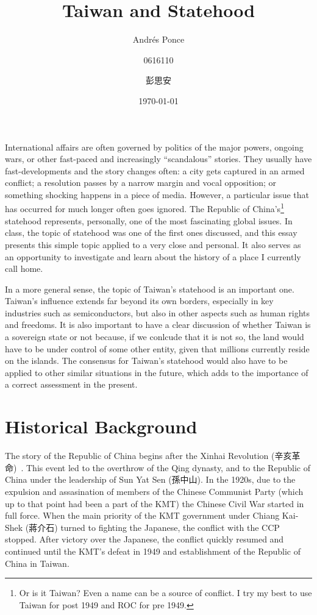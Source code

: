 \documentclass{article}
\author{Andr\'es Ponce \\
\and
0616110 \\
\and
彭思安
}
\title{Taiwan and Statehood}
\date{\today}
\begin{document}
\maketitle
International affairs are often governed by politics of the major powers, ongoing wars,
or other fast-paced and increasingly ``scandalous'' stories. They usually have fast-developments
and the story changes often: a city gets captured in an armed conflict; a resolution 
passes by a narrow margin and vocal opposition; or something shocking happens in a 
piece of media. 
However, a particular issue that has occurred for much longer often goes ignored. 
The Republic of China's\footnote{Or is it Taiwan? Even a name can be a source of conflict. I try my best
to use Taiwan for post 1949 and ROC for pre 1949.}
statehood represents, personally, one of the most fascinating global issues. 
In class, the topic of statehood was one of the first ones discussed, and this essay 
presents this simple topic applied to a very close and personal. It also serves as an opportunity 
to investigate and learn about the history of a place I currently call home.

In a more general sense, the topic of Taiwan's statehood is an important one. Taiwan's
influence extends far beyond its own borders, especially in key industries such as semiconductors,
but also in other aspects such as human rights and freedoms. It is also important to have a clear
discussion of whether Taiwan is a sovereign state or not because, if we conlcude that it is not so, 
the land would have to be under control of some other entity, given that millions currently reside 
on the islands. The consensus for Taiwan's statehood would also have to be applied to other similar 
situations in the future, which adds to the importance of a correct assessment in the present.

\section{Historical Background}
The story of the Republic of China begins after the Xinhai Revolution (辛亥革命)~\cite{ChineseRevolution}.
This event led to the overthrow of the Qing dynasty, and to the Republic of China
under the leadership of Sun Yat Sen (孫中山). 
In the 1920s, due to the expulsion and 
assasination of members of the Chinese Communist Party\cite{ChineseCivilWar} (which up to that point had
been a part of the KMT) the Chinese Civil War started in full force. 
When the main priority of the KMT government under Chiang Kai-Shek (蔣介石) turned to 
fighting the Japanese, the conflict with the CCP stopped. After victory over the 
Japanese, the conflict quickly resumed and continued until the KMT's defeat in 1949
and establishment of the Republic of China in Taiwan.
\end{document}
